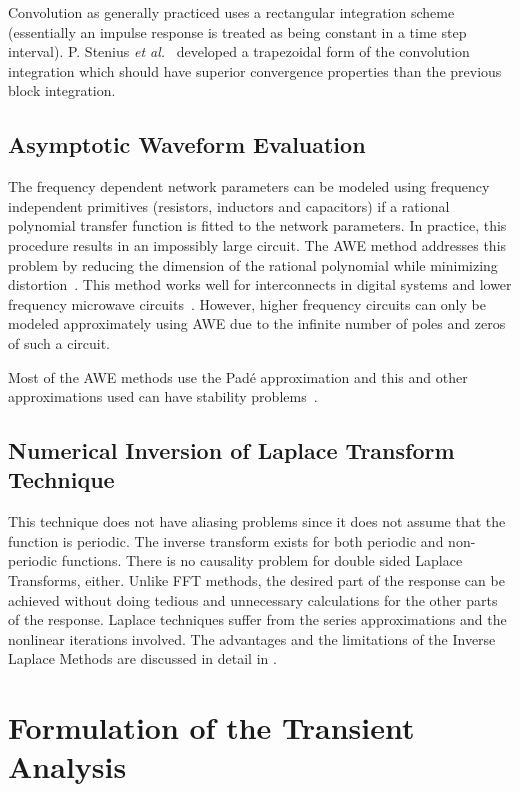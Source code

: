 Convolution as generally practiced uses a rectangular integration
scheme (essentially an impulse response is treated as being constant
in a time step interval). P. Stenius \emph{et al.}~\cite{aplac}
developed a trapezoidal form of the convolution integration which
should have superior convergence properties than the previous block
integration.

\subsection{Asymptotic Waveform Evaluation}

The frequency dependent network parameters can be modeled using
frequency independent primitives (resistors, inductors and capacitors)
if a rational polynomial transfer function is fitted to the network
parameters. In practice, this procedure results in an impossibly large
circuit. The AWE method addresses this problem by reducing the
dimension of the rational polynomial while minimizing
distortion~\cite{chan:AWE,multi:pade}. This method works well for
interconnects in digital systems and lower frequency microwave
circuits~\cite{Nakhla:Eli,Trithy}. However, higher frequency circuits
can only be modeled approximately using AWE due to the infinite number
of poles and zeros of such a circuit.

Most of the AWE methods use the Pad\'e approximation and this and
other approximations used can have stability problems~\cite{chan:AWE}.


\subsection{Numerical Inversion of Laplace Transform Technique}

This technique does not have aliasing problems since it does not
assume that the function is periodic. The inverse transform exists for
both periodic and non-periodic functions. There is no causality
problem for double sided Laplace Transforms, either. Unlike FFT
methods, the desired part of the response can be achieved without
doing tedious and unnecessary calculations for the other parts of the
response. Laplace techniques suffer from the series approximations and
the nonlinear iterations involved. The advantages and the limitations
of the Inverse Laplace Methods are discussed in detail in
\cite{Nakhla:Grif}.


\section{Formulation of the Transient Analysis}

